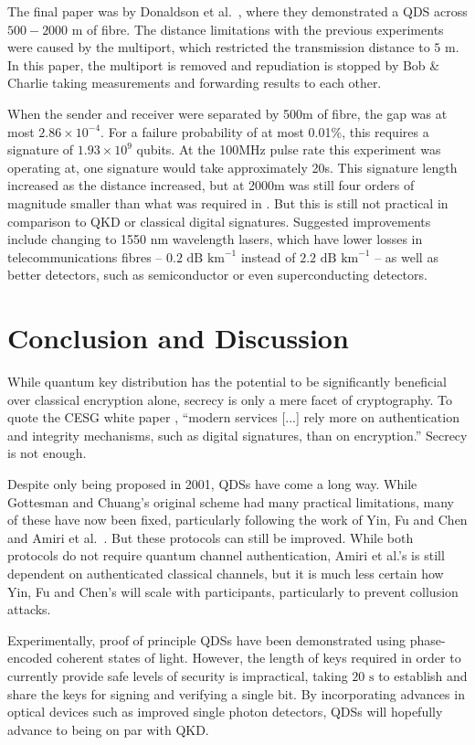 \documentclass[%
 reprint,
 amsmath,amssymb,
 aps,
 pra,
]{revtex4-1}
\begin{document}
The final paper was by Donaldson et al.\ \cite{PhysRevA.93.012329}, where they demonstrated a QDS across $500-2000\text{ m}$ of fibre. The distance limitations with the previous experiments were caused by the multiport, which restricted the transmission distance to $5\text{ m}$. In this paper, the multiport is removed and repudiation is stopped by Bob \& Charlie taking measurements and forwarding results to each other.

When the sender and receiver were separated by 500m of fibre, the gap was at most $2.86 \times 10^{-4}$. For a failure probability of at most 0.01\%, this requires a signature of $1.93 \times 10^{9}$ qubits. At the 100MHz pulse rate this experiment was operating at, one signature would take approximately 20s. This signature length increased as the distance increased, but at 2000m was still four orders of magnitude smaller than what was required in \cite{PhysRevLett.113.040502}. But this is still not practical in comparison to QKD or classical digital signatures. Suggested improvements include changing to 1550 nm wavelength lasers, which have lower losses in telecommunications fibres -- $0.2\text{ dB km}^{-1}$ instead of $2.2\text{ dB km}^{-1}$ -- as well as better detectors, such as semiconductor \cite{0957-0233-21-1-012002} or even superconducting \cite{0953-2048-25-6-063001} detectors.

\section{Conclusion and Discussion}
\label{sec:conclusion}

While quantum key distribution has the potential to be significantly beneficial over classical encryption alone, secrecy is only a mere facet of cryptography. To quote the CESG white paper \cite{CESG16}, ``modern services [...] rely more on authentication and integrity mechanisms, such as digital signatures, than on encryption.'' Secrecy is not enough.

Despite only being proposed in 2001, QDSs have come a long way. While Gottesman and Chuang's original scheme \cite{quant-ph/0105032} had many practical limitations, many of these have now been fixed, particularly following the work of Yin, Fu and Chen \cite{PhysRevA.93.032316} and Amiri et al.\ \cite{PhysRevA.93.032325}. But these protocols can still be improved. While both protocols do not require quantum channel authentication, Amiri et al.'s is still dependent on authenticated classical channels, but it is much less certain how Yin, Fu and Chen's will scale with participants, particularly to prevent collusion attacks.

Experimentally, proof of principle QDSs have been demonstrated using phase-encoded coherent states of light. However, the length of keys required in order to currently provide safe levels of security is impractical, taking $20\text{ s}$ to establish and share the keys for signing and verifying a single bit. By incorporating advances in optical devices such as improved single photon detectors, QDSs will hopefully advance to being on par with QKD.


\appendix
\end{document}
